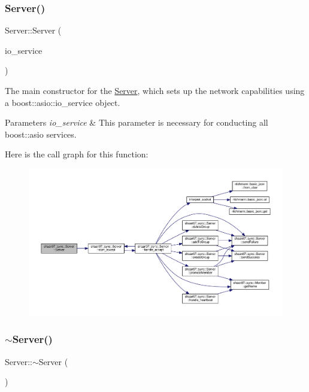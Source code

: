 \subsubsection{\texorpdfstring{Server()}{Server()}\hspace{0.1cm}{\footnotesize\ttfamily [1/2]}}
{\footnotesize\ttfamily Server\+::\+Server (\begin{DoxyParamCaption}\item[{boost\+::asio\+::io\+\_\+service \&}]{io\+\_\+service }\end{DoxyParamCaption})}

The main constructor for the \hyperlink{classshaan97_1_1sync_1_1_server}{Server}, which sets up the network capabilities using a {\ttfamily boost\+::asio\+::io\+\_\+service} object.


\begin{DoxyParams}{Parameters}
{\em io\+\_\+service} & This parameter is necessary for conducting all boost\+::asio services. \\
\hline
\end{DoxyParams}
Here is the call graph for this function\+:\nopagebreak
\begin{figure}[H]
\begin{center}
\leavevmode
\includegraphics[width=350pt]{classshaan97_1_1sync_1_1_server_ac9ad7c8bb7fe2f5da5101da1297c9ae1_cgraph}
\end{center}
\end{figure}
\mbox{\label{classshaan97_1_1sync_1_1_server_a4b3aa2579cb1c8cd1d069582c14d0fa6}} 
\subsubsection{\texorpdfstring{$\sim$\+Server()}{~Server()}}
{\footnotesize\ttfamily Server\+::$\sim$\+Server (\begin{DoxyParamCaption}{ }\end{DoxyParamCaption})\hspace{0.3cm}{\ttfamily [virtual]}}



